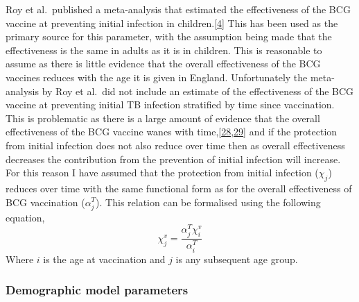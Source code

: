 \documentclass[11pt,twoside]{bristolthesis}
\begin{document}
  Roy et al.~published a meta-analysis that estimated the effectiveness of the BCG vaccine at preventing initial infection in children.{[}\protect\hyperlink{ref-Roy2014}{4}{]} This has been used as the primary source for this parameter, with the assumption being made that the effectiveness is the same in adults as it is in children. This is reasonable to assume as there is little evidence that the overall effectiveness of the BCG vaccines reduces with the age it is given in England. Unfortunately the meta-analysis by Roy et al.~did not include an estimate of the effectiveness of the BCG vaccine at preventing initial TB infection stratified by time since vaccination. This is problematic as there is a large amount of evidence that the overall effectiveness of the BCG vaccine wanes with time,{[}\protect\hyperlink{ref-Abubakar2013}{28},\protect\hyperlink{ref-Mangtani2017}{29}{]} and if the protection from initial infection does not also reduce over time then as overall effectiveness decreases the contribution from the prevention of initial infection will increase. For this reason I have assumed that the protection from initial infection (\(\chi_j\)) reduces over time with the same functional form as for the overall effectiveness of BCG vaccination (\(\alpha^T_j\)). This relation can be formalised using the following equation,
  \begin{equation}
    \chi^v_j = \frac{\alpha^T_j\chi^v_i}{\alpha^T_i}
    \label{eq:fun-prev-initial-inf}
  \end{equation}
  Where \(i\) is the age at vaccination and \(j\) is any subsequent age group.
  
  \hypertarget{demo-model-parameters}{%
  \subsubsection{Demographic model parameters}\label{demo-model-parameters}}
  
\end{document}
